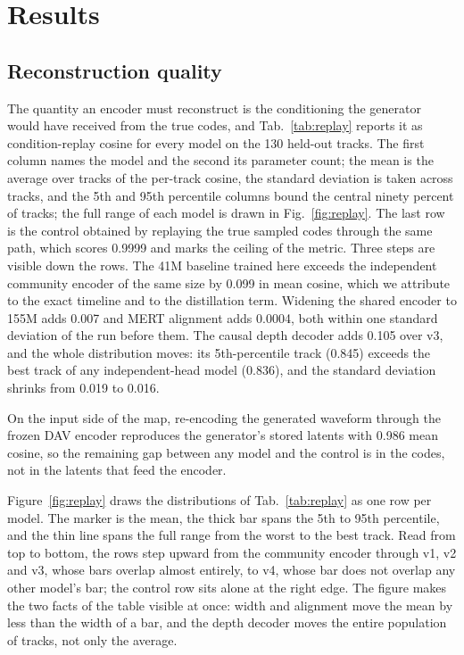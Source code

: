 \section{Results}
\label{sec:results}

\subsection{Reconstruction quality}

The quantity an encoder must reconstruct is the conditioning the generator would have received from the true codes, and Tab.~\ref{tab:replay} reports it as condition-replay cosine for every model on the 130 held-out tracks. The first column names the model and the second its parameter count; the mean is the average over tracks of the per-track cosine, the standard deviation is taken across tracks, and the 5th and 95th percentile columns bound the central ninety percent of tracks; the full range of each model is drawn in Fig.~\ref{fig:replay}. The last row is the control obtained by replaying the true sampled codes through the same path, which scores 0.9999 and marks the ceiling of the metric. Three steps are visible down the rows. The 41M baseline trained here exceeds the independent community encoder of the same size by 0.099 in mean cosine, which we attribute to the exact timeline and to the distillation term. Widening the shared encoder to 155M adds 0.007 and MERT alignment adds 0.0004, both within one standard deviation of the run before them. The causal depth decoder adds 0.105 over v3, and the whole distribution moves: its 5th-percentile track (0.845) exceeds the best track of any independent-head model (0.836), and the standard deviation shrinks from 0.019 to 0.016.



On the input side of the map, re-encoding the generated waveform through the frozen DAV encoder reproduces the generator's stored latents with 0.986 mean cosine, so the remaining gap between any model and the control is in the codes, not in the latents that feed the encoder.

Figure~\ref{fig:replay} draws the distributions of Tab.~\ref{tab:replay} as one row per model. The marker is the mean, the thick bar spans the 5th to 95th percentile, and the thin line spans the full range from the worst to the best track. Read from top to bottom, the rows step upward from the community encoder through v1, v2 and v3, whose bars overlap almost entirely, to v4, whose bar does not overlap any other model's bar; the control row sits alone at the right edge. The figure makes the two facts of the table visible at once: width and alignment move the mean by less than the width of a bar, and the depth decoder moves the entire population of tracks, not only the average.


